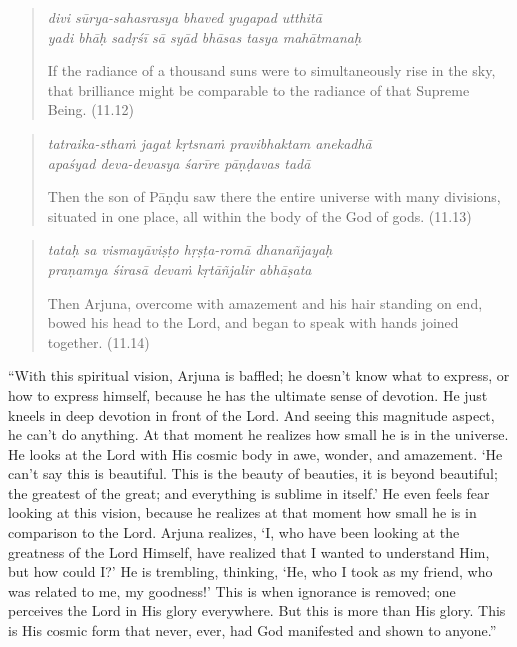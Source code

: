 \documentclass[12pt, twoside, openright]{memoir}
\begin{document}
\par
\begin{verse}
\textit{divi sūrya-sahasrasya bhaved yugapad utthitā} \\
\textit{yadi bhāḥ sadṛśī sā syād bhāsas tasya mahātmanaḥ}

\noindent If the radiance of a thousand suns were to simultaneously rise in the sky, that brilliance might be comparable to the radiance of that Supreme Being. (11.12)
\end{verse}
\par



\par
\begin{verse}
\textit{tatraika-sthaṁ jagat kṛtsnaṁ pravibhaktam anekadhā} \\
\textit{apaśyad deva-devasya śarīre pāṇḍavas tadā}

\noindent Then the son of Pāṇḍu saw there the entire universe with many divisions, situated in one place, all within the body of the God of gods. (11.13)
\end{verse}
\par



\par
\begin{verse}
\textit{tataḥ sa vismayāviṣṭo hṛṣṭa-romā dhanañjayaḥ} \\
\textit{praṇamya śirasā devaṁ kṛtāñjalir abhāṣata}

\noindent Then Arjuna, overcome with amazement and his hair standing on end, bowed his head to the Lord, and began to speak with hands joined together. (11.14)
\end{verse}
\par


\enquote{With this spiritual vision, Arjuna is baffled; he doesn’t know what to express, or how to express himself, because he has the ultimate sense of devotion. He just kneels in deep devotion in front of the Lord. And seeing this magnitude aspect, he can’t do anything. At that moment he realizes how small he is in the universe. He looks at the Lord with His cosmic body in awe, wonder, and amazement. \enquote{He can’t say this is beautiful. This is the beauty of beauties, it is beyond beautiful; the greatest of the great; and everything is sublime in itself.} He even feels fear looking at this vision, because he realizes at that moment how small he is in comparison to the Lord. Arjuna realizes, \enquote{I, who have been looking at the greatness of the Lord Himself, have realized that I wanted to understand Him, but how could I?} He is trembling, thinking, \enquote{He, who I took as my friend, who was related to me, my goodness!} This is when ignorance is removed; one perceives the Lord in His glory everywhere. But this is more than His glory. This is His cosmic form that never, ever, had God manifested and shown to anyone.}
\end{document}
